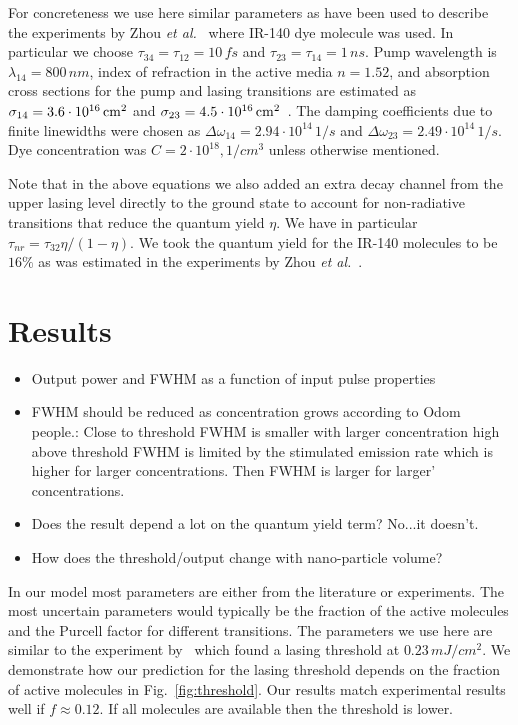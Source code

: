 \documentclass{iopart}
\begin{document}
For concreteness we use here similar parameters as have been used to
describe the experiments by Zhou {\it et al.}~\cite{zhou_lasing_2013} where IR-140 dye molecule
was used. In particular we choose $\tau_{34}=\tau_{12}=10\, fs$
and $\tau_{23}=\tau_{14}=1\, ns$. Pump wavelength is $\lambda_{14}=800\, nm$,
index of refraction in the active media $n=1.52$, and
absorption cross sections for the pump and lasing transitions are
estimated as $\sigma_{14}=3.6\cdot 10^{16}\, {\rm cm^2}$ and
$\sigma_{23}=4.5\cdot 10^{16}\, {\rm cm^2}$~\cite{sperber_experimental_1988}. 
The damping coefficients due to finite linewidths were chosen
as $\Delta \omega_{14}=2.94\cdot 10^{14}\, 1/s$ 
and $\Delta \omega_{23}=2.49\cdot 10^{14}\, 1/s$. Dye concentration
was $C=2\cdot 10^{18}, 1/cm^3$ unless otherwise mentioned.

Note that in the above equations we also added an extra decay channel from the upper lasing level directly to the ground state to account for
non-radiative transitions that reduce the quantum yield $\eta$. We have in particular
$\tau_{nr}=\tau_{32} \eta/(1-\eta)$. We took the quantum yield for the IR-140 molecules to be $16\%$ as was estimated in the experiments by Zhou {\it et al.}~\cite{zhou_lasing_2013}. 




\section{Results}

\begin{itemize}
\item Output power and FWHM as a function of input pulse properties
\item FWHM should be reduced as concentration grows according to Odom people.: Close to threshold FWHM is smaller with larger concentration
high above threshold FWHM is limited by the stimulated emission rate
which is higher for larger concentrations. Then FWHM is larger for larger'
concentrations.
\item Does the result depend a lot on the quantum yield term?  No...it doesn't. 
\item How does the threshold/output change with nano-particle volume?
\end{itemize}

In our model most parameters are either from the literature or
experiments. The most uncertain parameters would typically be the fraction
of the active molecules and the Purcell factor for different transitions.
The parameters we use here are similar to the experiment by~\cite{zhou_lasing_2013} which found a lasing threshold
at $0.23\, mJ/cm^2$. We demonstrate how our prediction
for the lasing threshold depends on the fraction
of active molecules in Fig.~\ref{fig:threshold}. Our results
match experimental results well if $f\approx 0.12$.
If all molecules are
available then the threshold is lower.
\end{document}
